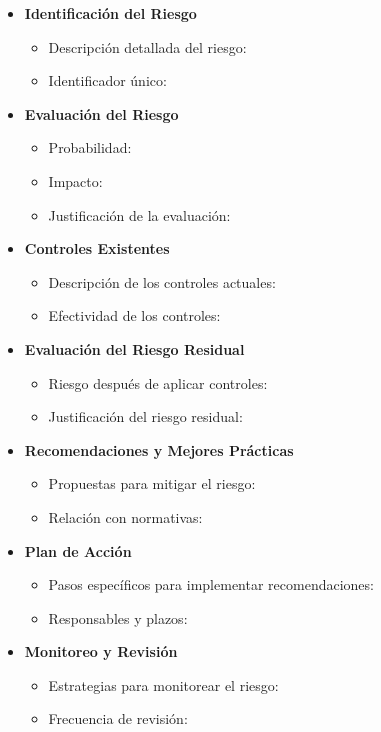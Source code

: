 \begin{itemize}
  \item \textbf{Identificación del Riesgo}
    \begin{itemize}
      \item Descripción detallada del riesgo:
      \item Identificador único:
    \end{itemize}
  \item \textbf{Evaluación del Riesgo}
    \begin{itemize}
      \item Probabilidad:
      \item Impacto:
      \item Justificación de la evaluación:
    \end{itemize}
  \item \textbf{Controles Existentes}
    \begin{itemize}
      \item Descripción de los controles actuales:
      \item Efectividad de los controles:
    \end{itemize}
  \item \textbf{Evaluación del Riesgo Residual}
    \begin{itemize}
      \item Riesgo después de aplicar controles:
      \item Justificación del riesgo residual:
    \end{itemize}
  \item \textbf{Recomendaciones y Mejores Prácticas}
    \begin{itemize}
      \item Propuestas para mitigar el riesgo:
      \item Relación con normativas:
    \end{itemize}
  \item \textbf{Plan de Acción}
    \begin{itemize}
      \item Pasos específicos para implementar recomendaciones:
      \item Responsables y plazos:
    \end{itemize}
  \item \textbf{Monitoreo y Revisión}
    \begin{itemize}
      \item Estrategias para monitorear el riesgo:
      \item Frecuencia de revisión:

\end{itemize}
\end{itemize}
